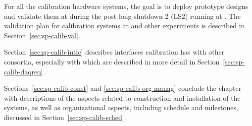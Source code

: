 For all the calibration hardware systems, the goal is to deploy prototype designs and validate them at  during the post long shutdown 2 (LS2) running  at . The validation plan for calibration systems at  and other experiments is described in Section~\ref{sec:sp-calib-val}. 

Section~\ref{sec:sp-calib-intfc} describes interfaces calibration has with other  consortia, especially  with  which are described in more detail in Section~\ref{sec:sp-calib-daqreq}. 

Sections~\ref{sec:sp-calib-const} and \ref{sec:sp-calib-org-manag} conclude the chapter with descriptions of the aspects related to construction and installation of the systems, as well as organizational aspects, including schedule and milestones, discussed in Section~\ref{sec:sp-calib-sched}.

